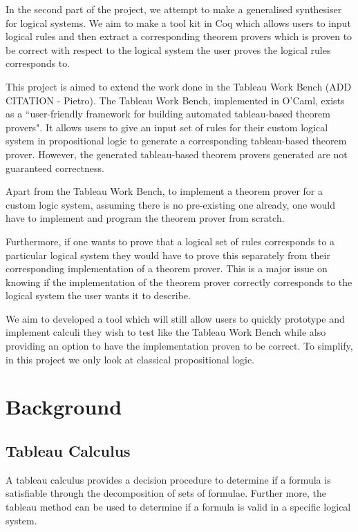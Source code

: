 \documentclass{article}
\begin{document}
In the second part of the project, we attempt to make a generalised synthesiser
for logical systems. We aim to make a tool kit in Coq which allows users to
input logical rules and then extract a corresponding theorem provers which is
proven to be correct with respect to the logical system the user proves the
logical rules corresponds to.

This project is aimed to extend the work done in the Tableau Work Bench
(ADD CITATION - Pietro). The Tableau Work Bench, implemented in O'Caml, exists
as a ``user-friendly framework for building automated tableau-based theorem
provers". It allows users to give an input set of rules for their custom
logical system in propositional logic to generate a corresponding tableau-based
theorem prover. However, the generated tableau-based theorem provers generated
are not guaranteed correctness.

Apart from the Tableau Work Bench, to implement a theorem prover for a custom
logic system, assuming there is no pre-existing one already, one would have to
implement and program the theorem prover from scratch.

Furthermore, if one wants to prove that a logical set of rules corresponds to
a particular logical system they would have to prove this separately from their
corresponding implementation of a theorem prover. This is a major issue on
knowing if the implementation of the theorem prover correctly corresponds to
the logical system the user wants it to describe.

We aim to developed a tool which will still allow users to quickly prototype
and implement calculi they wish to test like the Tableau Work Bench while also
providing an option to have the implementation proven to be correct.
To simplify, in this project we only look at classical propositional logic.

\section{Background}

\subsection{Tableau Calculus}

A tableau calculus provides a decision procedure to determine if a formula
is satisfiable through the decomposition of sets of formulae. Further more,
the tableau method can be used to determine if a formula is valid in a specific
logical system.
\end{document}

